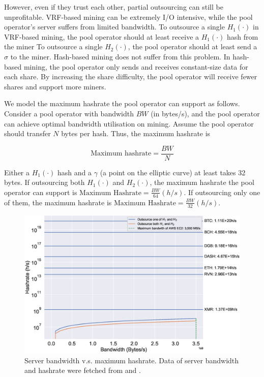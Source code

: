 However, even if they trust each other, partial outsourcing can still be unprofitable.
VRF-based mining can be extremely I/O intensive, while the pool operator's server suffers from limited bandwidth.
To outsource a single $H_1(\cdot)$ in VRF-based mining, the pool operator should at least receive a $H_1(\cdot)$ hash from the miner
To outsource a single $H_2(\cdot)$, the pool operator should at least send a $\sigma$ to the miner.
Hash-based mining does not suffer from this problem.
In hash-based mining, the pool operator only sends and receives constant-size data for each share.
By increasing the share difficulty, the pool operator will receive fewer shares and support more miners.

We model the maximum hashrate the pool operator can support as follows.
Consider a pool operator with bandwidth $BW$ (in bytes/s), and the pool operator can achieve optimal bandwidth utilisation on mining.
Assume the pool operator should transfer $N$ bytes per hash.
Thus, the maximum hashrate is

$$\text{Maximum hashrate} = \frac{BW}{N}$$

Either a $H_1(\cdot)$ hash and a $\gamma$ (a point on the elliptic curve) at least takes 32 bytes.
If outsourcing both $H_1(\cdot)$ and $H_2(\cdot)$, the maximum hashrate the pool operator can support is $\text{Maximum Hashrate} = \frac{BW}{64} (h/s)$.
If outsourcing only one of them, the maximum hashrate is $\text{Maximum Hashrate} = \frac{BW}{32} (h/s)$.

\begin{figure}[htp]
    \centering
    \includegraphics[width=\linewidth]{figs/max-hashrate.eps}
    \caption{Server bandwidth v.s. maximum hashrate.
    Data of server bandwidth and hashrate were fetched from \cite{aws} and \cite{coinwarz}.}
    \label{fig:max-hashrate}
\end{figure}

